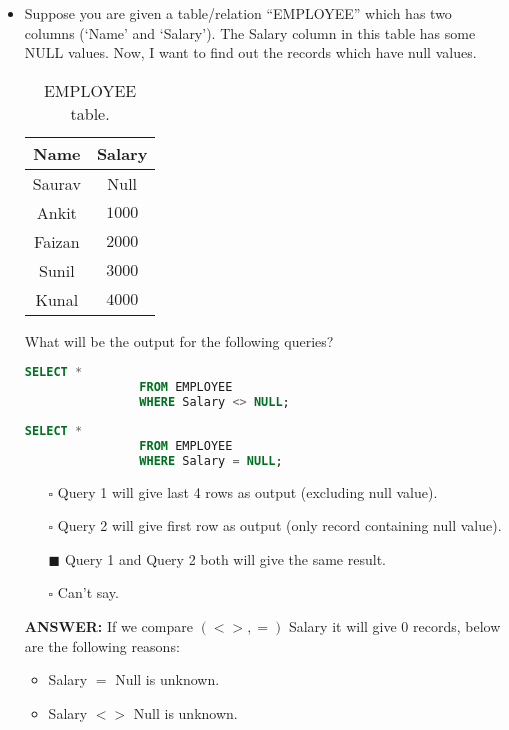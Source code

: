 \documentclass[10pt]{article}
\newcommand{\lightrule}{%
	\arrayrulecolor{black!30}%
	\midrule[\lightrulewidth]%
	\arrayrulecolor{black}}
\begin{document}
\begin{itemize}
		\newpage

		\item Suppose you are given a table/relation “EMPLOYEE” which has two columns (‘Name’ and ‘Salary’). The Salary column in this table has some NULL values. Now, I want to find out the records which have null values.
			\begin{table}[H]
				\centering
				\begin{tabular}{@{} *{2}{c} @{}}
					\toprule
						\textbf{Name} & \textbf{Salary} \\
					\midrule
						Saurav & Null \\ 
					\lightrule
						Ankit & $1000$ \\  
					\lightrule
						Faizan & $2000$ \\
					\lightrule 
						Sunil & $3000$ \\ 
					\lightrule 
						Kunal & $4000$ \\ 
					\bottomrule
				\end{tabular}
				\caption{EMPLOYEE table.}
			\end{table}

			What will be the output for the following queries?
			\begin{lstlisting}[language=SQL,firstline=1, lastline=3] 
				SELECT * 
				FROM EMPLOYEE 
				WHERE Salary <> NULL;
			\end{lstlisting}
			\begin{lstlisting}[language=SQL,firstline=1, lastline=3] 
				SELECT * 
				FROM EMPLOYEE 
				WHERE Salary = NULL;
			\end{lstlisting}

			\begin{enumerate}
				\item[$\square$] Query 1 will give last 4 rows as output (excluding null value).
				\item[$\square$] Query 2 will give first row as output (only record containing null value).
				\item[$\blacksquare$] Query 1 and Query 2 both will give the same result.
				\item[$\square$] Can’t say.
			\end{enumerate}
			\color{red} \textbf{ANSWER:} \color{black} If we compare $(<>, =)$ Salary it will give 0 records, below are the following reasons:
			\begin{itemize}
				\item Salary $=$ Null is unknown.
				\item Salary $<>$ Null is unknown.
			\end{itemize}


\end{itemize}
\end{document}
